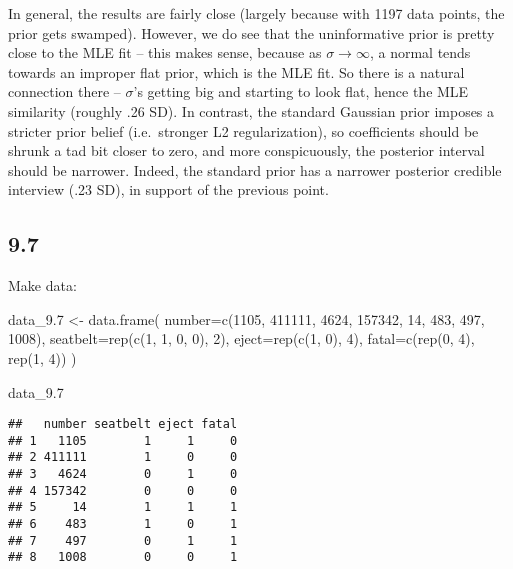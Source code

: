 \documentclass[
]{article}
\newenvironment{Shaded}{\begin{snugshade}}{\end{snugshade}}
\newcommand{\AttributeTok}[1]{\textcolor[rgb]{0.77,0.63,0.00}{#1}}
\newcommand{\DecValTok}[1]{\textcolor[rgb]{0.00,0.00,0.81}{#1}}
\newcommand{\FloatTok}[1]{\textcolor[rgb]{0.00,0.00,0.81}{#1}}
\newcommand{\FunctionTok}[1]{\textcolor[rgb]{0.00,0.00,0.00}{#1}}
\newcommand{\NormalTok}[1]{#1}
\newcommand{\OtherTok}[1]{\textcolor[rgb]{0.56,0.35,0.01}{#1}}
\begin{document}
In general, the results are fairly close (largely because with 1197 data
points, the prior gets swamped). However, we do see that the
uninformative prior is pretty close to the MLE fit -- this makes sense,
because as \(\sigma\to\infty\), a normal tends towards an improper flat
prior, which is the MLE fit. So there is a natural connection there --
\(\sigma\)'s getting big and starting to look flat, hence the MLE
similarity (roughly .26 SD). In contrast, the standard Gaussian prior
imposes a stricter prior belief (i.e.~stronger L2 regularization), so
coefficients should be shrunk a tad bit closer to zero, and more
conspicuously, the posterior interval should be narrower. Indeed, the
standard prior has a narrower posterior credible interview (.23 SD), in
support of the previous point.

\hypertarget{section-4}{%
\subsection{9.7}\label{section-4}}

Make data:

\begin{Shaded}
\begin{Highlighting}[]
\NormalTok{data\_9}\FloatTok{.7} \OtherTok{\textless{}{-}} \FunctionTok{data.frame}\NormalTok{(}
  \AttributeTok{number=}\FunctionTok{c}\NormalTok{(}\DecValTok{1105}\NormalTok{, }\DecValTok{411111}\NormalTok{, }\DecValTok{4624}\NormalTok{, }\DecValTok{157342}\NormalTok{, }
      \DecValTok{14}\NormalTok{, }\DecValTok{483}\NormalTok{, }\DecValTok{497}\NormalTok{, }\DecValTok{1008}\NormalTok{),}
  \AttributeTok{seatbelt=}\FunctionTok{rep}\NormalTok{(}\FunctionTok{c}\NormalTok{(}\DecValTok{1}\NormalTok{, }\DecValTok{1}\NormalTok{, }\DecValTok{0}\NormalTok{, }\DecValTok{0}\NormalTok{), }\DecValTok{2}\NormalTok{),}
  \AttributeTok{eject=}\FunctionTok{rep}\NormalTok{(}\FunctionTok{c}\NormalTok{(}\DecValTok{1}\NormalTok{, }\DecValTok{0}\NormalTok{), }\DecValTok{4}\NormalTok{),}
  \AttributeTok{fatal=}\FunctionTok{c}\NormalTok{(}\FunctionTok{rep}\NormalTok{(}\DecValTok{0}\NormalTok{, }\DecValTok{4}\NormalTok{), }\FunctionTok{rep}\NormalTok{(}\DecValTok{1}\NormalTok{, }\DecValTok{4}\NormalTok{))}
\NormalTok{)}

\NormalTok{data\_9}\FloatTok{.7}
\end{Highlighting}
\end{Shaded}

\begin{verbatim}
##   number seatbelt eject fatal
## 1   1105        1     1     0
## 2 411111        1     0     0
## 3   4624        0     1     0
## 4 157342        0     0     0
## 5     14        1     1     1
## 6    483        1     0     1
## 7    497        0     1     1
## 8   1008        0     0     1
\end{verbatim}
\end{document}
